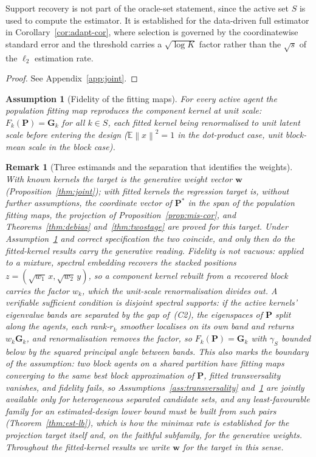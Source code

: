 \documentclass[12pt]{article}
\newtheorem{remark}{Remark}
\newtheorem{assumption}{Assumption}
\newcommand{\E}{\mathbb{E}}
\newcommand{\1}{\mathbf{1}}
\newcommand{\Pmat}{\mathbf{P}}
\newcommand{\bw}{\mathbf{w}}
\newcommand{\norm}[1]{\left\lVert#1\right\rVert}
\begin{document}
\noindent Support recovery is not part of the oracle-set statement, since the active
set $S$ is used to compute the estimator. It is established for the data-driven full estimator
in Corollary~\ref{cor:adapt-cor}, where selection is governed by the coordinatewise standard error and the
threshold carries a $\sqrt{\log K}$ factor rather than the $\sqrt s$ of the $\ell_2$ estimation rate.


\begin{proof}
See Appendix~\ref{app:joint}.
\end{proof}

\begin{assumption}[Fidelity of the fitting maps]
\label{ass:fid}
For every active agent the population fitting map reproduces the component kernel at unit scale:
$F_k(\Pmat)=\mathbf G_k$ for all $k\in S$, each fitted kernel being renormalised to unit latent
scale before entering the design ($\E\norm{x}^2=1$ in the dot-product case, unit block-mean scale
in the block case).
\end{assumption}

\begin{remark}[Three estimands and the separation that identifies the weights]
\label{rem:fid}
With known kernels the target is the generative weight vector $\bw$ (Proposition~\ref{thm:joint}); with
fitted kernels the regression target is, without further assumptions, the coordinate vector of $\Pmat^\ast$ in
the span of the population fitting maps, the projection of Proposition~\ref{prop:mis-cor}, and
Theorems~\ref{thm:debias} and~\ref{thm:twostage} are proved for this target. Under Assumption~\ref{ass:fid}
and correct specification the two coincide, and only then do the fitted-kernel results carry the generative
reading. Fidelity is not vacuous: applied to a mixture, spectral embedding recovers the stacked positions
$z=(\sqrt{w_1}\,x,\sqrt{w_2}\,y)$, so a component kernel rebuilt from a recovered block carries the factor
$w_k$, which the unit-scale renormalisation divides out. A verifiable sufficient condition is disjoint
spectral supports: if the active kernels' eigenvalue bands are separated by the gap of~(C2), the eigenspaces
of $\Pmat$ split along the agents, each rank-$r_k$ smoother localises on its own band and returns
$w_k\mathbf G_k$, and renormalisation removes the factor, so $F_k(\Pmat)=\mathbf G_k$ with $\gamma_S$ bounded
below by the squared principal angle between bands. This also marks the boundary of the assumption: two block
agents on a shared partition have fitting maps converging to the same best block approximation of $\Pmat$,
fitted transversality vanishes, and fidelity fails, so Assumptions~\ref{ass:transversality} and~\ref{ass:fid}
are jointly available only for heterogeneous separated candidate sets, and any least-favourable family for an
estimated-design lower bound must be built from such pairs (Theorem~\ref{thm:est-lb}), which is how the minimax rate is established for the projection target itself and, on the faithful subfamily, for the generative weights. Throughout the fitted-kernel results we write $\bw$ for the target in this sense.
\end{remark}
\end{document}
